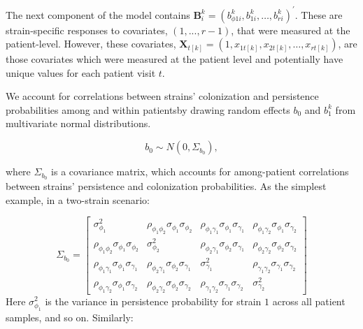 \documentclass{article}
\begin{document}
The next component of the model contains $ \textbf{B}^{k}_{i} = (b^k_{\phi1i}, b^k_{1i}, \dots, b^k_{ri})^{'} $. These are strain-specific responses to covariates, $(1,...,r-1)$, that were measured at the patient-level. However, these covariates, $ \textbf{X}_{t[k]} = (1, x_{1t[k]}, x_{2t[k]}, \dots, x_{rt[k]}) $, are those covariates which were measured at the patient level and potentially have unique values for each patient visit $t$.


We account for correlations between strains' colonization and persistence probabilities among and within patientsby drawing random effects $b_0$ and $b^k_1$ from multivariate normal distributions.

$$ b_0 \sim N(0, \Sigma_{b_{0}}), $$

where $\Sigma_{b_{0}}$ is a covariance matrix, which accounts for among-patient correlations between strains' persistence and colonization probabilities. As the simplest example, in a two-strain scenario:

$$ \Sigma_{b_{0}} = \left[
                \begin{array}{cccc}
                
                \sigma_{\phi_1}^2 & 
                \rho_{\phi_{1}\phi_{2}}\sigma_{\phi_1}\sigma_{\phi_2} & 
                \rho_{\phi_{1}\gamma_{1}}\sigma_{\phi_1}\sigma_{\gamma_1} & 
                \rho_{\phi_{1}\gamma_{2}}\sigma_{\phi_1}\sigma_{\gamma_2}  \\
                \rho_{\phi_{1}\phi_{2}}\sigma_{\phi_1}\sigma_{\phi_2} &
                \sigma_{\phi_2}^2 &
                \rho_{\phi_{2}\gamma_{1}}\sigma_{\phi_2}\sigma_{\gamma_1} & 
                \rho_{\phi_{2}\gamma_{2}}\sigma_{\phi_2}\sigma_{\gamma_2} \\ 
                \rho_{\phi_{1}\gamma_{1}}\sigma_{\phi_1}\sigma_{\gamma_1} &
                \rho_{\phi_{2}\gamma_{1}}\sigma_{\phi_2}\sigma_{\gamma_1} & 
                \sigma_{\gamma_1}^2 & 
                \rho_{\gamma_{1}\gamma_{2}}\sigma_{\gamma_1}\sigma_{\gamma_2} \\
                \rho_{\phi_{1}\gamma_{2}}\sigma_{\phi_1}\sigma_{\gamma_2} &
                \rho_{\phi_{2}\gamma_{2}}\sigma_{\phi_2}\sigma_{\gamma_2} &
                \rho_{\gamma_{1}\gamma_{2}}\sigma_{\gamma_1}\sigma_{\gamma_2} &
                \sigma_{\gamma_2}^2

                \end{array}
                \right]
$$
Here $\sigma_{\phi_1}^2$ is the variance in persistence probability for strain $1$ across all patient samples, and so on. Similarly:
\end{document}
